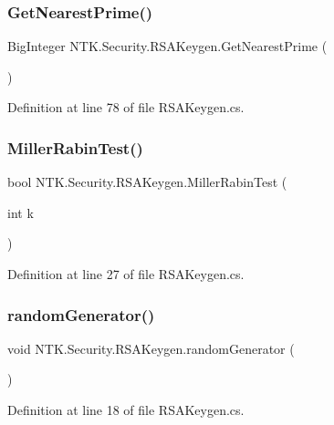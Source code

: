 \subsubsection{\texorpdfstring{GetNearestPrime()}{GetNearestPrime()}}
{\footnotesize\ttfamily Big\+Integer N\+T\+K.\+Security.\+R\+S\+A\+Keygen.\+Get\+Nearest\+Prime (\begin{DoxyParamCaption}{ }\end{DoxyParamCaption})}



Definition at line 78 of file R\+S\+A\+Keygen.\+cs.

\mbox{\label{class_n_t_k_1_1_security_1_1_r_s_a_keygen_a2b5b769ac9e69a247f42f2dbfc6ff290}} 
\subsubsection{\texorpdfstring{MillerRabinTest()}{MillerRabinTest()}}
{\footnotesize\ttfamily bool N\+T\+K.\+Security.\+R\+S\+A\+Keygen.\+Miller\+Rabin\+Test (\begin{DoxyParamCaption}\item[{int}]{k }\end{DoxyParamCaption})}



Definition at line 27 of file R\+S\+A\+Keygen.\+cs.

\mbox{\label{class_n_t_k_1_1_security_1_1_r_s_a_keygen_a4acced82b2cd5bbebbcb543b5ec21aff}} 
\subsubsection{\texorpdfstring{randomGenerator()}{randomGenerator()}}
{\footnotesize\ttfamily void N\+T\+K.\+Security.\+R\+S\+A\+Keygen.\+random\+Generator (\begin{DoxyParamCaption}{ }\end{DoxyParamCaption})}



Definition at line 18 of file R\+S\+A\+Keygen.\+cs.



